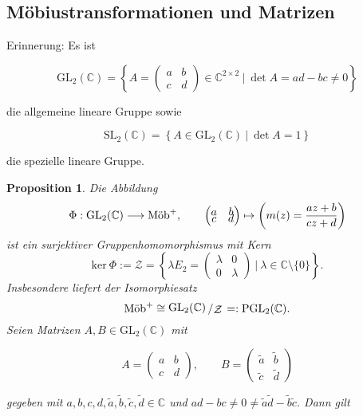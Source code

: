 \documentclass[11pt]{book}
\numberwithin{dummy}{section}
\newtheorem{proposition}[theorem]{Proposition}
\theoremstyle{nonumberbreak}
\newenvironment{pr}[1][]{\ifthenelse{\equal{#1}{}}{\proof}{\proof[#1]}\rm}{\endproof}
\newcommand{\kernel}{\mathrm{ker}\ }
\newcommand{\C}{\mathbb{C}}
\newcommand{\la}{\longrightarrow}
\newcommand{\mob}{\textup{Möb}^+}
\newcommand{\slant}[2]{{\raisebox{.1em}{$#1$}\left/\raisebox{-.1em}{$#2$}\right.}}
\begin{document}
\begin{spacing}{1.4}
\section{Möbiustransformationen und Matrizen} %



Erinnerung: Es ist
\begin{spacing}{1.2}
$$\mathrm{GL}_2(\C) = \left\{ A=\begin{pmatrix} a & b \\ c & d \end{pmatrix} \in \C^{2 \times 2} \ \bigg \vert \ \det A = ad-bc \neq 0 \right\}$$
\end{spacing}
die allgemeine lineare Gruppe sowie
\begin{spacing}{1.2}
$$\mathrm{SL}_2(\C) = \left\{ A \in \mathrm{GL}_2(\C) \ \big \vert \ \det A =1 \right\}$$
\end{spacing}die spezielle lineare Gruppe.


\hypertarget{propeinsfunfeins}{}
\begin{proposition}   %
Die Abbildung
$$\Phi: \mathrm{GL}_2(\C) \la \mob, \qquad \begin{pmatrix} a & b \\[-6pt] c & d \end{pmatrix} \mapsto \left( m(z) =\frac{az+b}{cz+d} \right)$$
ist ein surjektiver Gruppenhomomorphismus mit Kern
$$\kernel \Phi := \mathcal{Z} = \left\{ \lambda E_2 = \begin{pmatrix} \lambda & 0 \\[-6pt] 0 & \lambda \end{pmatrix} \ \bigg\vert \ \lambda \in \C\setminus \{0\} \right\}.$$
Insbesondere liefert der Isomorphiesatz
$$\mob \cong \slant{ \mathrm{GL}_2(\C)}{\mathcal{Z}} =: \mathrm{PGL}_2(\C).$$
\begin{pr}
Seien Matrizen $A,B \in \mathrm{GL}_2(\C)$ mit 

$$A= \begin{pmatrix} a & b \\[-6pt] c & d \end{pmatrix}, \qquad B= \begin{pmatrix} \tilde{a} & \tilde{b} \\[-6pt] \tilde{c} & \tilde{d} \end{pmatrix} $$

gegeben mit $a,b,c,d, \tilde{a}, \tilde{b}, \tilde{c}, \tilde{d} \in \C$ und $ad-bc \neq 0 \neq \tilde{a}\tilde{d} - \tilde{b} \tilde{c}$. Dann gilt 


\end{pr}
\end{proposition}
\end{spacing}
\end{document}
